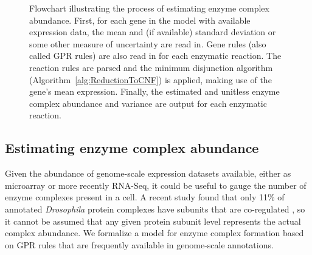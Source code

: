 \vspace{5 mm} 
\begin{figure}
\begin{center}
\end{center}
\caption{Flowchart illustrating the process of estimating enzyme
  complex abundance. First, for each gene in the model with
  available expression data, the mean and (if available) standard deviation or
  some other measure of uncertainty are read in. Gene rules (also
  called GPR rules) are also read in for each enzymatic reaction. The
  reaction rules are parsed and the minimum disjunction algorithm
  (Algorithm~\ref{alg:ReductionToCNF}) is applied, making use of the
  gene's mean expression. Finally, the estimated and unitless enzyme
  complex abundance and variance are output for each enzymatic
  reaction.}
\label{ECCN_flowchart}
\end{figure}

\subsection{Estimating enzyme complex abundance}

Given the abundance of genome-scale expression datasets available,
either as microarray or more recently RNA-Seq, it could be useful to
gauge the number of enzyme complexes present in a cell. A recent
study found that only 11\% of annotated \textit{Drosophila}
protein complexes have subunits that are co-regulated
\citep{Juschke2013}, so it cannot be assumed that any given protein
subunit level represents the actual complex abundance. We formalize a
model for enzyme complex formation based on GPR rules that are
frequently available in genome-scale annotations.

